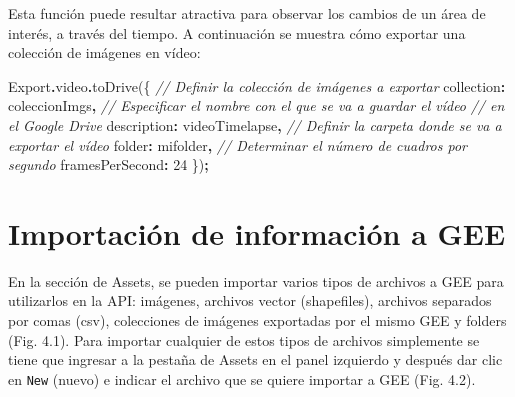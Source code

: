 \documentclass[
  12pt,
  letterpaper,
  twoside]{book}
\newenvironment{Shaded}{\begin{snugshade}}{\end{snugshade}}
\newcommand{\AttributeTok}[1]{\textcolor[rgb]{0.77,0.63,0.00}{#1}}
\newcommand{\CommentTok}[1]{\textcolor[rgb]{0.56,0.35,0.01}{\textit{#1}}}
\newcommand{\DataTypeTok}[1]{\textcolor[rgb]{0.13,0.29,0.53}{#1}}
\newcommand{\DecValTok}[1]{\textcolor[rgb]{0.00,0.00,0.81}{#1}}
\newcommand{\FunctionTok}[1]{\textcolor[rgb]{0.00,0.00,0.00}{#1}}
\newcommand{\NormalTok}[1]{#1}
\newcommand{\OperatorTok}[1]{\textcolor[rgb]{0.81,0.36,0.00}{\textbf{#1}}}
\newcommand{\StringTok}[1]{\textcolor[rgb]{0.31,0.60,0.02}{#1}}
\begin{document}
Esta función puede resultar atractiva para observar los cambios de un área de interés, a través del tiempo. A continuación se muestra cómo exportar una colección de imágenes en vídeo:

\begin{Shaded}
\begin{Highlighting}[]
\NormalTok{Export}\OperatorTok{.}\AttributeTok{video}\OperatorTok{.}\FunctionTok{toDrive}\NormalTok{(\{}
  \CommentTok{// Definir la colección de imágenes a exportar}
  \DataTypeTok{collection}\OperatorTok{:}\NormalTok{ coleccionImgs}\OperatorTok{,}
  \CommentTok{// Especificar el nombre con el que se va a guardar el vídeo}
  \CommentTok{// en el Google Drive}
  \DataTypeTok{description}\OperatorTok{:} \StringTok{\textquotesingle{}videoTimelapse\textquotesingle{}}\OperatorTok{,}
  \CommentTok{// Definir la carpeta donde se va a exportar el vídeo}
  \DataTypeTok{folder}\OperatorTok{:} \StringTok{\textquotesingle{}mifolder\textquotesingle{}}\OperatorTok{,}
  \CommentTok{// Determinar el número de cuadros por segundo}
  \DataTypeTok{framesPerSecond}\OperatorTok{:} \DecValTok{24}
\NormalTok{ \})}\OperatorTok{;}
\end{Highlighting}
\end{Shaded}

\newpage

\hypertarget{importaciuxf3n-de-informaciuxf3n-a-gee}{%
\chapter{Importación de información a GEE}\label{importaciuxf3n-de-informaciuxf3n-a-gee}}

En la sección de Assets, se pueden importar varios tipos de archivos a GEE para utilizarlos en la API: imágenes, archivos vector (shapefiles), archivos separados por comas (csv), colecciones de imágenes exportadas por el mismo GEE y folders (Fig. 4.1). Para importar cualquier de estos tipos de archivos simplemente se tiene que ingresar a la pestaña de Assets en el panel izquierdo y después dar clic en \texttt{New} (nuevo) e indicar el archivo que se quiere importar a GEE (Fig. 4.2).
\end{document}
